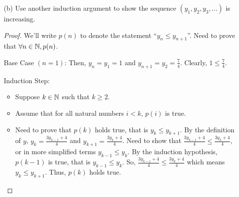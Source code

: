 \documentclass[12pt,letterpaper]{article}
\begin{document}
\begin{itemize}[leftmargin=!,labelindent=5pt]
\begin{itemize}
\begin{proof}
                    Induction Step:
                        \begin{itemize}
                            \item Suppose $k \in \bbN$ such that $k \geq 2$.
                            \item Assume that for all natural numbers $i < k$, $y_{i+1} < 4$.
                            \item Need to prove that $y_k < 4$, that is $\frac{3y_{k-1}+4}{4} = \frac{3}{4} y_{k-1} + 1 < 4$.
                            By the induction hypothesis, $y_{k-1} < 4$. So, $\frac{3}{4}y_{k-1} < 3$ which means $\frac{3}{4}y_{k-1} + 1 < 4$.
                            So, $y_k < 4$.
                        \end{itemize}
                    Hence, by the principle of complete induction, $\forall n \in \bbN, y_n < 4$.
                \end{proof}
            \item [(b)] Use another induction argument to show the sequence $(y_1, y_2, y_3, ...)$ is increasing.
                
                \begin{proof}
                    We'll write $p(n)$ to denote the statement \enquote{$y_n \leq y_{n+1}$}. Need to prove that $\forall n \in \mathbb{N}, p(n)$.

                    Base Case $(n=1)$: Then, $y_n = y_1 = 1$ and $y_{n+1} = y_2 = \frac{7}{4}$. Clearly, $1 \leq \frac{7}{4}$.

                    Induction Step:
                        \begin{itemize}
                            \item Suppose $k \in \bbN$ such that $k \geq 2$.
                            \item Assume that for all natural numbers $i < k$, $p(i)$ is true.
                            \item Need to prove that $p(k)$ holds true, that is $y_k \leq y_{k+1}$.
                            By the definition of $y$, $y_k = \frac{3y_{k-1} + 4}{4}$ and $y_{k+1} = \frac{3y_{k} + 4}{4}$.
                            Need to show that $\frac{3y_{k-1} + 4}{4} \leq \frac{3y_{k} + 4}{4}$, or in more simplified terms $y_{k-1} \leq y_{k}$.
                            By the induction hypothesis, $p(k-1)$ is true, that is $y_{k-1} \leq y_{k}$. 
                            So, $\frac{3y_{k-1} + 4}{4} \leq \frac{3y_{k} + 4}{4}$ which means $y_k \leq y_{k+1}$. Thus, $p(k)$ holds true.
                        \end{itemize}
                    

\end{proof}
\end{itemize}
\end{itemize}
\end{document}
